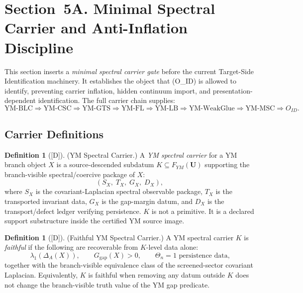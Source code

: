 \documentclass[12pt,oneside]{amsbook}
\theoremstyle{plain}
\theoremstyle{definition}
\newtheorem{definition}[theorem]{Definition}
\theoremstyle{remark}
\newcommand{\status}[1]{\textup{[#1]}}
\begin{document}
\section{Section~5A. Minimal Spectral Carrier and Anti-Inflation Discipline}
\label{sec:YM-MSC}

This section inserts a \emph{minimal spectral carrier gate} before the
current Target-Side Identification machinery. It establishes the
object that (O\_ID) is allowed to identify, preventing carrier inflation,
hidden continuum import, and presentation-dependent identification.
The full carrier chain supplies:
\[
 \text{YM-BLC}
 \Rightarrow \text{YM-CSC}
 \Rightarrow \text{YM-GTS}
 \Rightarrow \text{YM-FL}
 \Rightarrow \text{YM-LB}
 \Rightarrow \text{YM-WeakGlue}
 \Rightarrow \text{YM-MSC}
 \Rightarrow O_{ID}.
\]

\subsection{Carrier Definitions}

\begin{definition}[\status{D}]\label{def:YM-spectral-carrier}
\textup{(YM Spectral Carrier.)}
A \emph{YM spectral carrier} for a YM branch object $X$ is a
source-descended subdatum
$K \subseteq F_{YM}(\mathbf{U})$
supporting the branch-visible spectral/coercive package of $X$:
\[
 (S_X,\; T_X,\; G_X,\; D_X),
\]
where $S_X$ is the covariant-Laplacian spectral observable package,
$T_X$ is the transported invariant data, $G_X$ is the gap-margin
datum, and $D_X$ is the transport/defect ledger verifying persistence.
$K$ is not a primitive. It is a declared support substructure inside
the certified YM source image.
\end{definition}

\begin{definition}[\status{D}]\label{def:YM-faithful-carrier}
\textup{(Faithful YM Spectral Carrier.)}
A YM spectral carrier $K$ is \emph{faithful} if the following are
recoverable from $K$-level data alone:
\[
 \lambda_1(\Delta_A(X)),\qquad
 G_{\mathrm{gap}}(X) > 0,\qquad
 \Theta_n = 1 \text{ persistence data,}
\]
together with the branch-visible equivalence class of the
screened-sector covariant Laplacian. Equivalently, $K$ is faithful
when removing any datum outside $K$ does not change the branch-visible
truth value of the YM gap predicate.
\end{definition}
\end{document}
